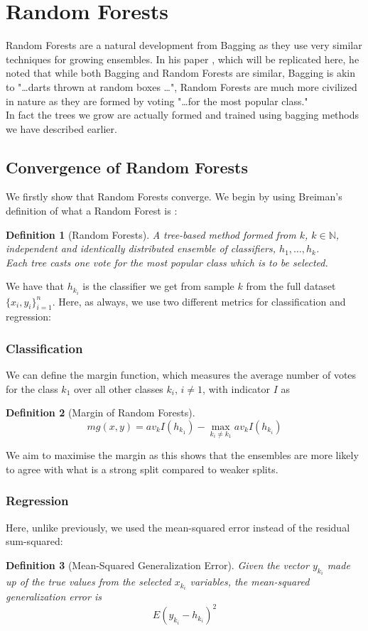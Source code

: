 \documentclass[11pt,a4paper]{report}
\newtheorem{definition}{Definition}
\begin{document}
\section{Random Forests}
Random Forests are a natural development from Bagging as they use very similar techniques for growing ensembles. 
In his paper \cite{randomforest}, which will be replicated here, he noted that while both Bagging and Random Forests are similar, Bagging is akin to "\dots darts thrown at random boxes \dots", Random Forests are much more civilized in nature as they are formed by voting "\dots for the most popular class."\\
In fact the trees we grow are actually formed and trained using bagging methods we have described earlier.


\subsection{Convergence of Random Forests}
We firstly show that Random Forests converge.
We begin by using Breiman's definition of what a Random Forest is \cite{randomforest}:
\begin{definition}[Random Forests]
    A tree-based method formed from $k$, $k \in \mathbb{N}$, independent and identically distributed ensemble of classifiers, $h_1, \dots , h_k$.\\
    Each tree casts one vote for the most popular class which is to be selected.
\end{definition}
We have that $h_{k_i}$ is the classifier we get from sample $k$ from the full dataset $\{x_i, y_i\}_{i=1}^{n}$. 
Here, as always, we use two different metrics for classification and regression:
\subsubsection{Classification}
We can define the margin function, which measures the average number of votes for the class $k_1$ over all other classes $k_i$, $i \neq 1$, with indicator $I$ as 
\begin{definition}[Margin of Random Forests]
   \[ mg(x, y) = av_k I (h_{k_1}) - \max_{k_i \neq k_1} av_k I (h_{k_i}) \] 
\end{definition}

We aim to maximise the margin as this shows that the ensembles are more likely to agree with what is a strong split compared to weaker splits.

\subsubsection{Regression}
Here, unlike previously, we used the mean-squared error instead of the residual sum-squared:
\begin{definition}[Mean-Squared Generalization Error]
    Given the vector $y_{k_i}$ made up of the true values from the selected $x_{k_i}$ variables, the mean-squared generalization error is
    \[ E(y_{k_i} - h_{k_i})^2 \]
\end{definition}
\end{document}
